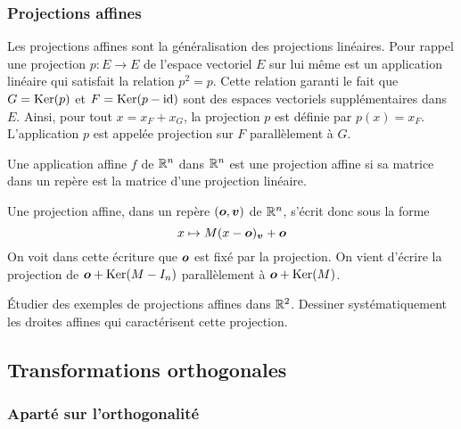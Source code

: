 \documentclass[11pt, a4paper]{article}
\begin{document}
\subsubsection{Projections affines}

Les projections affines sont la généralisation des projections
linéaires. Pour rappel une projection $p : E \rightarrow E$ de
l'espace vectoriel $E$ sur lui même est un application linéaire qui
satisfait la relation $p^2 = p$. Cette relation garanti le fait que
$G = \operatorname{Ker}(p)$ et $F = \operatorname{Ker}(p-\mathrm{id})$ sont des espaces vectoriels
supplémentaires dans $E$. Ainsi, pour tout $x = x_F + x_G$, la
projection $p$ est définie par $p(x) = x_F$. L'application $p$ est
appelée projection sur $F$ parallèlement à $G$.
\begin{defn}
  Une application affine $f$ de $\mathbb{R}^n$ dans $\mathbb{R}^n$ est une projection
  affine si sa matrice dans un repère est la matrice d'une projection
  linéaire.
\end{defn}
\noindent Une projection affine, dans un repère $(\boldsymbol{o}, \boldsymbol{v})$ de
$\mathbb{R}^n$, s'écrit donc sous la forme
\[
x \mapsto M(x - \boldsymbol{o})_{\boldsymbol{v}} + \boldsymbol{o}
\]
On voit dans cette écriture que $\boldsymbol{o}$ est fixé par la
projection. On vient d'écrire la projection de $\boldsymbol{o} + \operatorname{Ker}(M-I_n)$
parallèlement à $\boldsymbol{o} + \operatorname{Ker}(M)$.
\begin{question}
  Étudier des exemples de projections affines dans $\mathbb{R}^2$. Dessiner
  systématiquement les droites affines qui caractérisent cette
  projection.
\end{question}

\subsection{Transformations orthogonales}

\subsubsection{Aparté sur l'orthogonalité}
\end{document}
